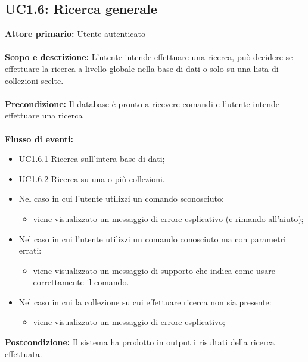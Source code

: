\documentclass{scalatekids-article}
\begin{document}
\subsection{UC1.6: Ricerca generale}
\textbf{Attore primario:} Utente autenticato \\ \\
\textbf{Scopo e descrizione:} L’utente intende effettuare una ricerca, può decidere se effettuare la ricerca a livello globale nella base di dati o solo su una lista di collezioni scelte.\\ \\
\textbf{Precondizione:} Il database è pronto a ricevere comandi e l’utente intende effettuare una ricerca\\ \\
\textbf{Flusso di eventi:}
\begin{itemize}
\item UC1.6.1 Ricerca sull'intera base di dati;
\item UC1.6.2 Ricerca su una o più collezioni.
\end{itemize}
\begin{itemize}
\item Nel caso in cui l'utente utilizzi un comando sconosciuto:
  \begin{itemize}
  \item viene visualizzato un messaggio di errore esplicativo (e rimando all'aiuto);
  \end{itemize}
\item Nel caso in cui l'utente utilizzi un comando conosciuto ma con parametri errati:
  \begin{itemize}
  \item viene visualizzato un messaggio di supporto che indica come usare correttamente il comando.
  \end{itemize}
\item Nel caso in cui la collezione su cui effettuare ricerca non sia presente:
  \begin{itemize}
  \item viene visualizzato un messaggio di errore esplicativo;
  \end{itemize}
\end{itemize}
\textbf{Postcondizione:} Il sistema ha prodotto in output i risultati della ricerca effettuata.
\end{document}
